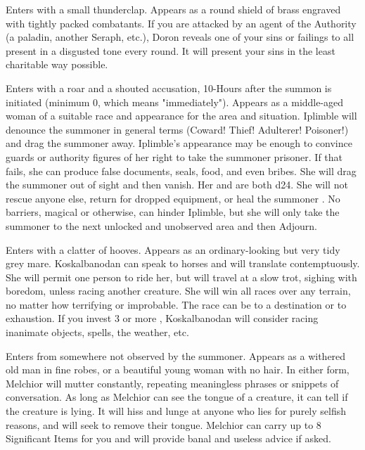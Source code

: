 {
Enters with a small thunderclap. Appears as a round shield of brass engraved with tightly packed combatants. If you are attacked by an agent of the Authority (a paladin, another Seraph, etc.), Doron reveals one of your sins or failings to all present in a disgusted tone every round.  It will present your sins in the least charitable way possible.



Enters with a roar and a shouted accusation, 10-\SUMDICE Hours after the summon is initiated (minimum 0, which means "immediately"). Appears as a middle-aged woman of a suitable race and appearance for the area and situation. Iplimble will denounce the summoner in general terms (Coward! Thief! Adulterer! Poisoner!) and drag the summoner away. Iplimble's appearance may be enough to convince guards or authority figures of her right to take the summoner prisoner. If that fails, she can produce false documents, seals, food, and even bribes. She will drag the summoner out of sight and then vanish. Her \VIG and \MD are both d24. She will not rescue anyone else, return for dropped equipment, or heal the summoner . No barriers, magical or otherwise, can hinder Iplimble, but she will only take the summoner to the next unlocked and unobserved area and then Adjourn.


Enters with a clatter of hooves. Appears as an ordinary-looking but very tidy grey mare. Koskalbanodan can speak to horses and will translate contemptuously. She will permit one person to ride her, but will travel at a slow trot, sighing with boredom, unless racing another creature. She will win all races over any terrain, no matter how terrifying or improbable. The race can be to a destination or to exhaustion. If you invest 3 or more \DICE, Koskalbanodan will consider racing inanimate objects, spells, the weather, etc.


Enters from somewhere not observed by the summoner. Appears as a withered old man in fine robes, or a beautiful young woman with no hair. In either form, Melchior will mutter constantly, repeating meaningless phrases or snippets of conversation. As long as Melchior can see the tongue of a creature, it can tell if the creature is lying. It will hiss and lunge at anyone who lies for purely selfish reasons, and will seek to remove their tongue. Melchior can carry up to 8 Significant Items for you and will provide banal and useless advice if asked.


}
